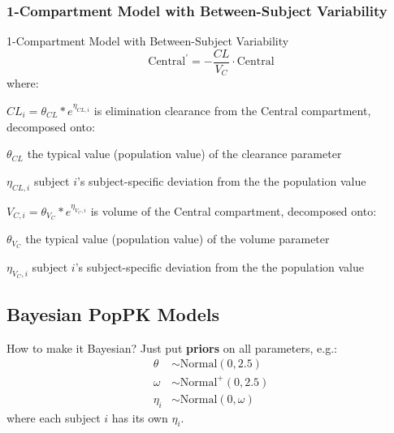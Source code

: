 \subsubsection{1-Compartment Model with Between-Subject Variability}
\begin{frame}{1-Compartment Model with Between-Subject Variability}
    $$
        \text{Central}^{\prime} = -\frac{CL}{V_C} \cdot \text{Central}
    $$
    where:
    \begin{vfilleditems}
        \item $CL_i = \theta_{CL} * e^{\eta_{CL,i}}$ is elimination clearance from the Central compartment,
        decomposed onto:
        \begin{vfilleditems}
            \item $\theta_{CL}$ the typical value (population value) of the clearance parameter
            \item $\eta_{CL, i}$ subject $i$'s subject-specific deviation from the the population value
        \end{vfilleditems}
        \item $V_{C,i} = \theta_{V_C} * e^{\eta_{V_C,i}}$ is volume of the Central compartment,
        decomposed onto:
        \begin{vfilleditems}
            \item $\theta_{V_C}$ the typical value (population value) of the volume parameter
            \item $\eta_{V_C,i}$ subject $i$'s subject-specific deviation from the the population value
        \end{vfilleditems}
    \end{vfilleditems}
\end{frame}

\subsection{Bayesian PopPK Models}
\begin{frame}{How to make it Bayesian?}
    Just put \textbf{priors} on all parameters, e.g.:
    $$
        \begin{aligned}
            \theta   & \sim \text{Normal}(0, 2.5)  \\
            \omega   & \sim \text{Normal}^+(0, 2.5)  \\
            \eta_{i} & \sim \text{Normal}(0, \omega)
        \end{aligned}
    $$
    \vfill
    where each subject $i$ has its own $\eta_i$.
\end{frame}
